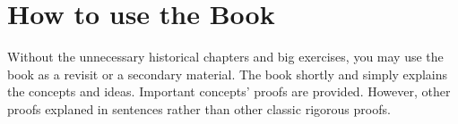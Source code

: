 \section*{How to use the Book}
Without the unnecessary historical chapters and big exercises, you may use the book as a revisit or a secondary material. The book shortly and simply explains the concepts and ideas. Important concepts' proofs are provided. However, other proofs explaned in sentences rather than other classic rigorous proofs.
